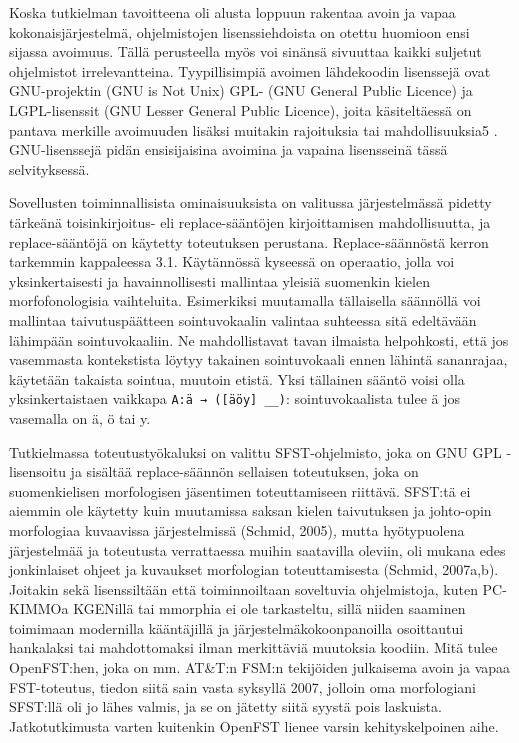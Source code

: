 \documentclass[free]{flammie}
\begin{document}
Koska tutkielman tavoitteena oli alusta loppuun rakentaa avoin ja vapaa kokonaisjärjestelmä, ohjelmistojen lisenssiehdoista on otettu huomioon ensi sijassa avoimuus. Tällä perusteella myös voi sinänsä sivuuttaa kaikki suljetut ohjelmistot irrelevantteina. Tyypillisimpiä avoimen lähdekoodin lisenssejä ovat GNU-projektin
(GNU is Not Unix) GPL- (GNU General Public Licence) ja LGPL-lisenssit (GNU
Lesser General Public Licence), joita käsiteltäessä on pantava merkille avoimuuden lisäksi muitakin rajoituksia tai mahdollisuuksia5 . GNU-lisenssejä pidän ensisijaisina avoimina ja vapaina lisensseinä tässä selvityksessä.

Sovellusten toiminnallisista ominaisuuksista on valitussa järjestelmässä pidetty
tärkeänä toisinkirjoitus- eli replace-sääntöjen kirjoittamisen mahdollisuutta, ja
replace-sääntöjä on käytetty toteutuksen perustana. Replace-säännöstä kerron tarkemmin kappaleessa 3.1. Käytännössä kyseessä on operaatio, jolla voi yksinkertaisesti ja havainnollisesti mallintaa yleisiä suomenkin kielen morfofonologisia
vaihteluita. Esimerkiksi muutamalla tällaisella säännöllä voi mallintaa taivutuspäätteen sointuvokaalin valintaa suhteessa sitä edeltävään lähimpään sointuvokaaliin. Ne mahdollistavat tavan ilmaista helpohkosti, että jos vasemmasta kontekstista löytyy takainen sointuvokaali ennen lähintä sananrajaa, käytetään takaista
sointua, muutoin etistä. Yksi tällainen sääntö voisi olla yksinkertaistaen vaikkapa
\verb|A:ä → ([äöy] __)|: sointuvokaalista tulee ä jos vasemalla on ä, ö tai y.

Tutkielmassa toteutustyökaluksi on valittu SFST-ohjelmisto, joka on GNU GPL
-lisensoitu ja sisältää replace-säännön sellaisen toteutuksen, joka on suomenkielisen morfologisen jäsentimen toteuttamiseen riittävä. SFST:tä ei aiemmin ole käytetty kuin muutamissa saksan kielen taivutuksen ja johto-opin morfologiaa kuvaavissa järjestelmissä (Schmid, 2005), mutta hyötypuolena järjestelmää ja toteutusta verrattaessa muihin saatavilla oleviin, oli mukana edes jonkinlaiset ohjeet ja
kuvaukset morfologian toteuttamisesta (Schmid, 2007a,b). Joitakin sekä lisenssiltään että toiminnoiltaan soveltuvia ohjelmistoja, kuten PC-KIMMOa KGENillä tai mmorphia ei ole tarkasteltu, sillä niiden saaminen toimimaan modernilla
kääntäjillä ja järjestelmäkokoonpanoilla osoittautui hankalaksi tai mahdottomaksi ilman merkittäviä muutoksia koodiin. Mitä tulee OpenFST:hen, joka on mm.
AT\&T:n FSM:n tekijöiden julkaisema avoin ja vapaa FST-toteutus, tiedon siitä
sain vasta syksyllä 2007, jolloin oma morfologiani SFST:llä oli jo lähes valmis, ja
se on jätetty siitä syystä pois laskuista. Jatkotutkimusta varten kuitenkin OpenFST
lienee varsin kehityskelpoinen aihe.
\end{document}
